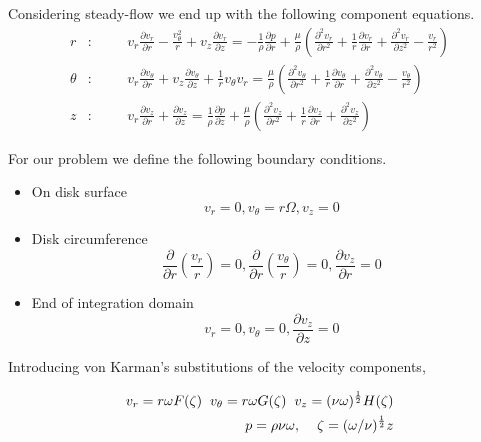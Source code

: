 \documentclass[a4paper,norsk]{article}
\begin{document}
Considering steady-flow we end up with the following component equations.
\begin{align}
r &: \hspace{1cm} v_r\frac{\partial v_r}{\partial r} - \frac{v_\theta^2}{r} + v_z\frac{\partial v_r}{\partial z}
= -\frac{1}{\rho} \frac{\partial p}{\partial r} + \frac{\mu}{\rho}( \frac{\partial^2 v_r}{\partial r^2} +
\frac{1}{r} \frac{\partial v_r}{\partial r} + \frac{\partial^2 v_r}{\partial z^2} - \frac{v_r}{r^2} ) \\
\theta &: \hspace{1cm} v_r\frac{\partial v_\theta}{\partial r} + v_z\frac{\partial v_\theta}{\partial z} +
\frac{1}{r}v_\theta v_r = \frac{\mu}{\rho} (\frac{\partial^2 v_\theta}{\partial r^2} +
\frac{1}{r} \frac{\partial v_\theta}{\partial r} + \frac{\partial^2 v_\theta}{\partial z^2} -
\frac{v_\theta}{r^2} ) \\
z &: \hspace{1cm} v_r \frac{\partial v_z}{\partial r} + \frac{\partial v_z}{\partial z} =
\frac{1}{\rho} \frac{\partial p}{\partial z} + \frac{\mu}{\rho} (\frac{\partial^2 v_z}{\partial r^2} +
\frac{1}{r} \frac{\partial v_z}{\partial r} + \frac{\partial^2 v_z}{\partial z^2}
)
\end{align}

For our problem we define the following boundary conditions.

\begin{itemize}
\item On disk surface $$v_r = 0, v_\theta = r\Omega, v_z = 0$$
\item Disk circumference $$\frac{\partial}{\partial r} (\frac{v_r}{r}) = 0,
\frac{\partial}{\partial r} (\frac{v_\theta}{r}) = 0,
 \frac{\partial v_z}{\partial r} = 0$$
\item End of integration domain $$v_r = 0, v_\theta = 0, \frac{\partial v_z}{\partial z} = 0 $$
\end{itemize}

Introducing von Karman's substitutions of the velocity components,

\begin{align*}
v_r = r \omega F(\zeta) \hspace{2mm} v_\theta = r \omega G(\zeta) \hspace{2mm}
v_z = (\nu \omega )^{\frac{1}{2}} H(\zeta) \\
p = \rho \nu \omega, \hspace{4mm} \zeta = (\omega/ \nu)^{\frac{1}{2}} z
\end{align*}
\end{document}
